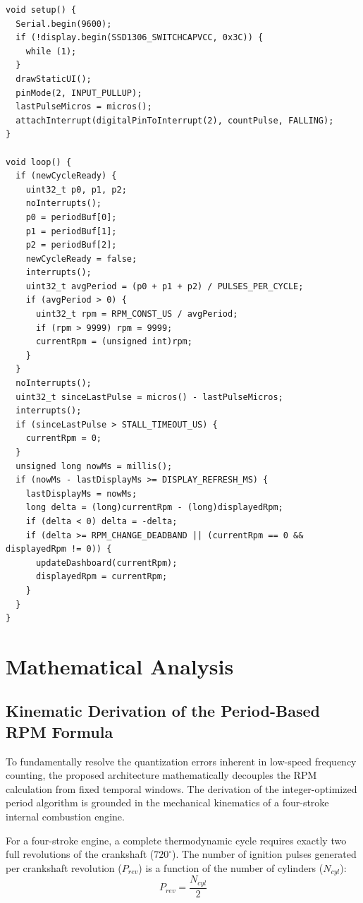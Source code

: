 \documentclass[journal, twocolumn]{IEEEtran}
\begin{document}
\begin{lstlisting}
void setup() {
  Serial.begin(9600);
  if (!display.begin(SSD1306_SWITCHCAPVCC, 0x3C)) {
    while (1); 
  }
  drawStaticUI();
  pinMode(2, INPUT_PULLUP);
  lastPulseMicros = micros();
  attachInterrupt(digitalPinToInterrupt(2), countPulse, FALLING);
}

void loop() {
  if (newCycleReady) {
    uint32_t p0, p1, p2;
    noInterrupts();
    p0 = periodBuf[0];
    p1 = periodBuf[1];
    p2 = periodBuf[2];
    newCycleReady = false;
    interrupts();
    uint32_t avgPeriod = (p0 + p1 + p2) / PULSES_PER_CYCLE;
    if (avgPeriod > 0) {
      uint32_t rpm = RPM_CONST_US / avgPeriod;   
      if (rpm > 9999) rpm = 9999;                
      currentRpm = (unsigned int)rpm;
    }
  }
  noInterrupts();
  uint32_t sinceLastPulse = micros() - lastPulseMicros;
  interrupts();
  if (sinceLastPulse > STALL_TIMEOUT_US) {
    currentRpm = 0;
  }
  unsigned long nowMs = millis();
  if (nowMs - lastDisplayMs >= DISPLAY_REFRESH_MS) {
    lastDisplayMs = nowMs;
    long delta = (long)currentRpm - (long)displayedRpm;
    if (delta < 0) delta = -delta;
    if (delta >= RPM_CHANGE_DEADBAND || (currentRpm == 0 && displayedRpm != 0)) {
      updateDashboard(currentRpm);
      displayedRpm = currentRpm;
    }
  }
}
\end{lstlisting}

\section{Mathematical Analysis}

\subsection{Kinematic Derivation of the Period-Based RPM Formula}
To fundamentally resolve the quantization errors inherent in low-speed frequency counting, the proposed architecture mathematically decouples the RPM calculation from fixed temporal windows. The derivation of the integer-optimized period algorithm is grounded in the mechanical kinematics of a four-stroke internal combustion engine.

For a four-stroke engine, a complete thermodynamic cycle requires exactly two full revolutions of the crankshaft ($720^\circ$). The number of ignition pulses generated per crankshaft revolution ($P_{rev}$) is a function of the number of cylinders ($N_{cyl}$):
\begin{equation}
P_{rev} = \frac{N_{cyl}}{2}
\label{eq:pulses_per_rev}
\end{equation}
\end{document}
